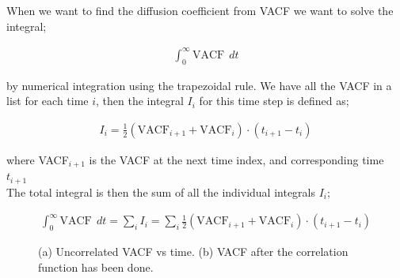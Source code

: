 \documentclass{article}
\begin{document}
When we want to find the diffusion coefficient from VACF we want
to solve the integral;

\begin{align}
    \int_0^\infty \mathrm{VACF} \ \ dt
\end{align}

by numerical integration using the trapezoidal rule.
We have all the VACF in a list for each time $i$, then the integral $I_i$
for this time step is defined as;

\begin{align}
    I_i = \frac{1}{2}(\mathrm{VACF}_{i+1} 
    + \mathrm{VACF}_i) \cdot (t_{i+1} - t_i)
\end{align}

where VACF$_{i+1}$ is the VACF at the next time index,
and corresponding time $t_{i+1}$\\

The total integral is then the sum of all the individual integrals $I_i$;

\begin{align}
    \int_0^\infty \mathrm{VACF} \ \ dt = \sum_i I_i = \sum_i \frac{1}{2}(\mathrm{VACF}_{i+1} 
    + \mathrm{VACF}_i) \cdot (t_{i+1} - t_i)
\end{align}



\begin{figure}[htb]
	\centering
  \caption{
    (a) Uncorrelated VACF vs time.
    (b) VACF after the correlation function has been done.
  }
\end{figure}
\end{document}
